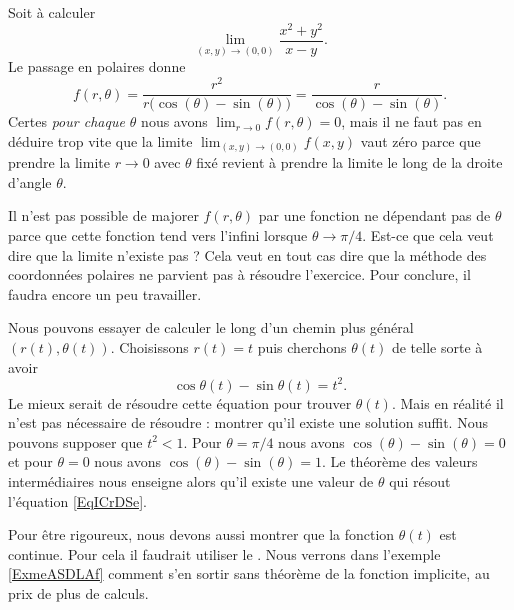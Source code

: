 \begin{example}
	Soit à calculer
	\begin{equation}
		\lim_{(x,y)\to(0,0)}\frac{ x^2+y^2 }{ x-y }.
	\end{equation}
	Le passage en polaires donne
	\begin{equation}
		f(r,\theta)=\frac{ r^2 }{ r\big( \cos(\theta)-\sin(\theta) \big) }=\frac{ r }{ \cos(\theta)-\sin(\theta) }.
	\end{equation}
	Certes \emph{pour chaque $\theta$} nous avons $\lim_{r\to 0} f(r,\theta)=0$, mais il ne faut pas en déduire trop vite que la limite $\lim_{(x,y)\to(0,0)}f(x,y)$ vaut zéro parce que prendre la limite $r\to 0$ avec $\theta$ fixé revient à prendre la limite le long de la droite d'angle $\theta$.

	Il n'est pas possible de majorer $f(r,\theta)$ par une fonction ne dépendant pas de $\theta$ parce que cette fonction tend vers l'infini lorsque $\theta\to\pi/4$. Est-ce que cela veut dire que la limite n'existe pas ? Cela veut en tout cas dire que la méthode des coordonnées polaires ne parvient pas à résoudre l'exercice. Pour conclure, il faudra encore un peu travailler.

    Nous pouvons essayer de calculer le long d'un chemin plus général \( (r(t),\theta(t))\). Choisissons \( r(t)=t\) puis cherchons \( \theta(t)\) de telle sorte à avoir 
    \begin{equation}        \label{EqICrDSe}
        \cos\theta(t)-\sin\theta(t)=t^2.
    \end{equation}
    Le mieux serait de résoudre cette équation pour trouver \( \theta(t)\). Mais en réalité il n'est pas nécessaire de résoudre : montrer qu'il existe une solution suffit. Nous pouvons supposer que \( t^2<1\). Pour \( \theta=\pi/4\) nous avons \( \cos(\theta)-\sin(\theta)=0\) et pour \( \theta=0\) nous avons \( \cos(\theta)-\sin(\theta)=1\). Le théorème des valeurs intermédiaires nous enseigne alors qu'il existe une valeur de \( \theta\) qui résout l'équation \eqref{EqICrDSe}.

    Pour être rigoureux, nous devons aussi montrer que la fonction \( \theta(t)\) est continue. Pour cela il faudrait utiliser le . Nous verrons dans l'exemple \ref{ExmeASDLAf} comment s'en sortir sans théorème de la fonction implicite, au prix de plus de calculs.
\end{example}


